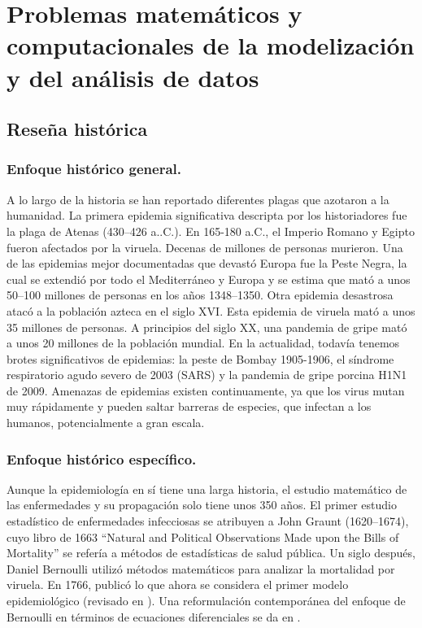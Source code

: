 \documentclass{article}
\begin{document}
 

 



\section{Problemas matemáticos y computacionales de la modelización y del análisis de datos} \label{proble} 




\subsection{Reseña histórica} \label{rhist} 

\subsubsection*{Enfoque histórico general.}
A lo largo de la historia se han reportado diferentes plagas que azotaron a la humanidad. La primera epidemia significativa descripta por los historiadores fue la plaga de Atenas (430--426 a..C.). En 165-180 a.C., el Imperio Romano y Egipto fueron afectados por la viruela. Decenas de millones de personas murieron. Una de las epidemias mejor documentadas que devastó Europa fue la Peste Negra, la cual se extendió por todo el Mediterráneo y Europa y se estima que mató a unos 50--100 millones de personas en los años 1348--1350. Otra epidemia desastrosa atacó a la población azteca en el siglo XVI. Esta epidemia de viruela mató a unos 35 millones de personas. A principios del siglo XX, una pandemia de gripe mató a unos 20 millones de la población mundial. En la actualidad, todavía tenemos brotes significativos de epidemias: la peste de Bombay 1905-1906, el síndrome respiratorio agudo severo de 2003 (SARS) y la pandemia de gripe porcina H1N1 de 2009. Amenazas de epidemias existen continuamente, ya que los virus mutan muy rápidamente y pueden saltar barreras de especies, que infectan a los humanos, potencialmente a gran escala.

\subsubsection{Enfoque histórico específico.}

Aunque la epidemiología en sí tiene una larga historia, el estudio matemático de las enfermedades y su propagación solo tiene unos 350 años. El primer estudio estadístico de enfermedades infecciosas se atribuyen a John Graunt (1620--1674), cuyo libro de 1663 ``Natural
and Political Observations Made upon the Bills of Mortality'' se refería a métodos de estadísticas de salud pública. Un siglo después, Daniel Bernoulli utilizó métodos matemáticos para analizar la mortalidad por viruela. En 1766, publicó lo que ahora se considera el primer modelo epidemiológico (revisado en \cite{bernoulli2004attempt}). Una reformulación contemporánea del enfoque de Bernoulli en términos de ecuaciones diferenciales se da en \cite{dietz2002daniel}.
\end{document}
